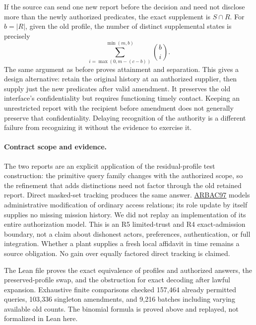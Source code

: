 \documentclass[11pt]{article}
\begin{document}
If the source can send one new report before the decision and need
not disclose more than the newly authorized predicates, the exact
supplement is \(S\cap R\). For \(b=|R|\), given the old profile,
the number of distinct supplemental states is precisely
\[
  \sum_{i=\max(0,m-(c-b))}^{\min(m,b)} \binom bi .
\]
The same argument as before proves attainment and separation.
This gives a design alternative: retain the original history at an
authorized supplier, then supply just the new predicates after valid
amendment. It preserves the old interface's confidentiality but
requires functioning timely contact. Keeping an unrestricted report
with the recipient before amendment does not generally preserve that
confidentiality. Delaying recognition of the authority is a different
failure from recognizing it without the evidence to exercise it.

\paragraph{Contract scope and evidence.}
The two reports are an explicit application of the residual-profile
test construction: the primitive query family changes with the
authorized scope, so the refinement that adds distinctions need not
factor through the old retained report. Direct masked-set tracking
produces the same answer. \href{https://doi.org/10.1145/300830.300839}{ARBAC97}
models administrative modification of ordinary access relations; its
role update by itself supplies no missing mission history. We did not
replay an implementation of its entire authorization model. This is an
R5 limited-trust and R4 exact-admission boundary, not a claim about
dishonest actors, preferences, authentication, or full integration.
Whether a plant supplies a fresh local affidavit in time remains a
source obligation. No gain over equally factored direct tracking is claimed.

The Lean file proves the exact equivalence of profiles and authorized
answers, the preserved-profile swap, and the obstruction for exact
decoding after lawful expansion. Exhaustive finite comparisons checked
157,464 already permitted queries, 103,336 singleton amendments,
and 9,216 batches including varying available old counts. The binomial
formula is proved above and replayed, not formalized in Lean here.
\end{document}
